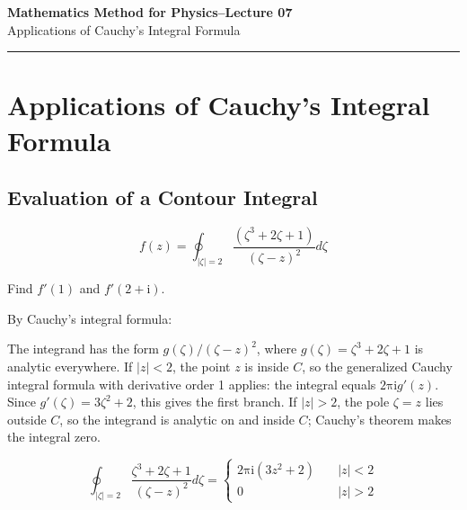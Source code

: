 \documentclass[11pt,a4paper]{article}
\theoremstyle{definition}
\theoremstyle{plain}
\begin{document}
\begin{center}
    {\LARGE \textbf{Mathematics Method for Physics--Lecture 07}} \\[0.6em]
    {\large Applications of Cauchy’s Integral Formula}
\end{center}

\vspace{-0.5em}
\noindent\rule{\textwidth}{0.5pt}

\vspace{0.8em}

\section{Applications of Cauchy's Integral Formula}

\subsection{Evaluation of a Contour Integral}

\begin{equation}
f(z) = \oint_{\vert{}\zeta\vert{} = 2}\frac{(\zeta^{3} + 2\zeta + 1)}{(\zeta - z)^{2}}d\zeta
\end{equation}

Find $f'(1)$ and $f'(2 + \mathrm{i})$.

By Cauchy's integral formula:

The integrand has the form $g(\zeta)/(\zeta - z)^{2}$, where $g(\zeta) = \zeta^{3} + 2\zeta + 1$ is analytic everywhere. If $\vert{}z\vert{} < 2$, the point $z$ is inside $C$, so the generalized Cauchy integral formula with derivative order 1 applies: the integral equals $2\mathrm{\pi}\mathrm{i}g'(z)$. Since $g'(\zeta) = 3\zeta^{2} + 2$, this gives the first branch. If $\vert{}z\vert{} > 2$, the pole $\zeta = z$ lies outside $C$, so the integrand is analytic on and inside $C$; Cauchy's theorem makes the integral zero.

\begin{equation}
\oint_{\vert{}\zeta\vert{} = 2}\frac{\zeta^{3} + 2\zeta + 1}{{(\zeta - z)}^{2}}d\zeta = \begin{cases} 2\mathrm{\pi}\mathrm{i}(3z^{2} + 2)\quad & \vert{}z\vert{} < 2 \\ 0 & \vert{}z\vert{} > 2 \end{cases}
\end{equation}
\end{document}
